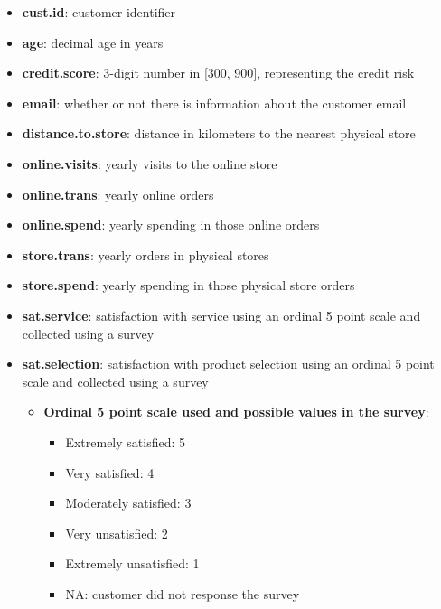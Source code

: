 \documentclass[
  ignorenonframetext,
]{beamer}
\providecommand{\tightlist}{%
  \setlength{\itemsep}{0pt}\setlength{\parskip}{0pt}}\usepackage{longtable,booktabs,array}
\begin{document}
\begin{frame}{}
\label{section-2}
\begin{itemize}
\tightlist
\item
  \textbf{cust.id}: customer identifier
\item
  \textbf{age}: decimal age in years
\item
  \textbf{credit.score}: 3-digit number in {[}300, 900{]}, representing
  the credit risk
\item
  \textbf{email}: whether or not there is information about the customer
  email
\item
  \textbf{distance.to.store}: distance in kilometers to the nearest
  physical store
\item
  \textbf{online.visits}: yearly visits to the online store
\item
  \textbf{online.trans}: yearly online orders
\item
  \textbf{online.spend}: yearly spending in those online orders
\item
  \textbf{store.trans}: yearly orders in physical stores
\item
  \textbf{store.spend}: yearly spending in those physical store orders
\end{itemize}
\end{frame}

\begin{frame}{}
\label{section-3}
\begin{itemize}
\item
  \textbf{sat.service}: satisfaction with service using an ordinal 5
  point scale and collected using a survey
\item
  \textbf{sat.selection}: satisfaction with product selection using an
  ordinal 5 point scale and collected using a survey

  \begin{itemize}
  \item
    \textbf{Ordinal 5 point scale used and possible values in the
    survey}:

    \begin{itemize}
    \tightlist
    \item
      Extremely satisfied: 5
    \item
      Very satisfied: 4
    \item
      Moderately satisfied: 3
    \item
      Very unsatisfied: 2
    \item
      Extremely unsatisfied: 1
    \item
      NA: customer did not response the survey
    \end{itemize}
  \end{itemize}
\end{itemize}
\end{frame}
\end{document}
